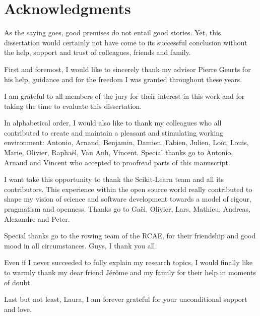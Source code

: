 
\chapter*{Acknowledgments}

As the saying goes, good premises do not entail good stories. Yet, this
dissertation would certainly not have come to its successful conclusion
without the help, support and trust of colleagues, friends and family.

First and foremost, I would like to sincerely thank my advisor Pierre Geurts
for his help, guidance and for the freedom I was granted throughout these
years.

I am grateful to all members of the jury for their interest in this work
and for taking the  time to evaluate this dissertation.

In alphabetical order, I would also like to thank my colleagues who all
contributed to create and maintain a pleasant and stimulating working
environment: Antonio, Arnaud, Benjamin, Damien, Fabien, Julien, Lo\"{i}c,
Louis, Marie, Olivier, Rapha\"{e}l, Van Anh, Vincent. Special thanks go to
Antonio, Arnaud and Vincent who accepted to proofread parts of this manuscript.

I want take this opportunity to thank the Scikit-Learn team and all its
contributors. This experience within the open source world really contributed
to shape my vision of science and software development towards a model
of rigour, pragmatism and openness. Thanks go to Ga\"{e}l, Olivier, Lars,
Mathieu, Andreas, Alexandre and Peter.

Special thanks go to the rowing team of the RCAE, for their friendship
and good mood in all circumstances. Guys, I thank you all.

Even if I never succeeded to fully explain my research topics, I would finally
like to warmly thank my dear friend J\'er\^{o}me and my family for their help
in moments of doubt.

Last but not least, Laura, I am forever grateful for your unconditional support
and love.
